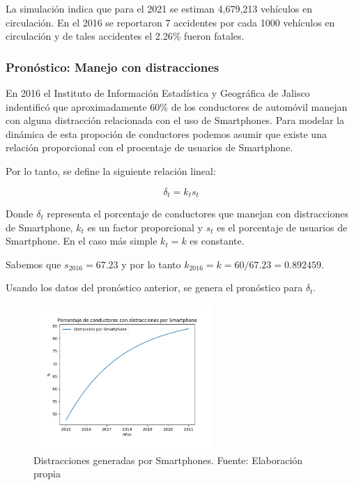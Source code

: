 \documentclass{article}
\begin{document}
La simulación indica que para el 2021 se estiman 4,679,213 vehículos en circulación.
En el 2016 se reportaron 7 accidentes por cada 1000 vehículos en circulación y de tales accidentes el
2.26\% fueron fatales.


\subsubsection{Pronóstico: Manejo con distracciones}

En 2016 el Instituto de Información Estadística y Geográfica de Jalisco indentificó que
aproximadamente 60\% de los conductores de automóvil manejan con alguna distracción
relacionada con el uso de Smartphones. Para modelar la dinámica de esta propoción de conductores podemos
asumir que existe una relación proporcional con el procentaje de usuarios de Smartphone.

Por lo tanto, se define la siguiente relación lineal:

\begin{equation}
\delta_t = k_t s_t
\end{equation}

Donde $\delta_t$ representa el porcentaje de conductores que manejan con distracciones de Smartphone,
$k_t$ es un factor proporcional y $s_t$ es el porcentaje de usuarios de Smartphone. En el caso más
simple $k_t = k$ es constante.


Sabemos que $s_{2016} = 67.23$ y por lo tanto $k_{2016} = k = 60/67.23 = 0.892459$.

Usando los datos del pronóstico anterior, se genera el pronóstico para $\delta_t$.

	\begin{figure}[H]\centering
	\includegraphics[width=0.6\textwidth]{resources/img/distraction.png}
	\caption{\label{fig:distr} Distracciones generadas por Smartphones. Fuente: Elaboración propia}
    \end{figure}
\end{document}
